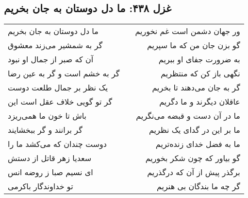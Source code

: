 \begin{center}
\section*{غزل ۴۳۸: ما دل دوستان به جان بخریم}
\label{sec:438}
\begin{longtable}{l p{0.5cm} r}
ما دل دوستان به جان بخریم
&&
ور جهان دشمن است غم نخوریم
\\
گر به شمشیر می‌زند معشوق
&&
گو بزن جان من که ما سپریم
\\
آن که صبر از جمال او نبود
&&
به ضرورت جفای او ببریم
\\
گر به خشم است و گر به عین رضا
&&
نگهی باز کن که منتظریم
\\
یک نظر بر جمال طلعت دوست
&&
گر به جان می‌دهند تا بخریم
\\
گر تو گویی خلاف عقل است این
&&
عاقلان دیگرند و ما دگریم
\\
باش تا خون ما همی‌ریزد
&&
ما در آن دست و قبضه می‌نگریم
\\
گر برانند و گر ببخشایند
&&
ما بر این در گدای یک نظریم
\\
دوست چندان که می‌کشد ما را
&&
ما به فضل خدای زنده‌تریم
\\
سعدیا زهر قاتل از دستش
&&
گو بیاور که چون شکر بخوریم
\\
ای نسیم صبا ز روضه انس
&&
برگذر پیش از آن که درگذریم
\\
تو خداوندگار باکرمی
&&
گر چه ما بندگان بی هنریم
\\
\end{longtable}
\end{center}
